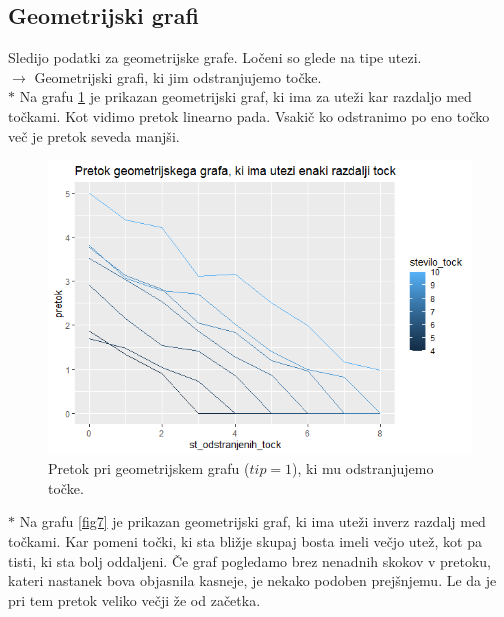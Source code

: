 \documentclass[a4paper]{article}
\begin{document}
\subsection{Geometrijski grafi}
Sledijo podatki za geometrijske grafe. Ločeni so glede na tipe utezi. \\

$\rightarrow $ Geometrijski grafi, ki jim odstranjujemo točke. \\

$\ast$ Na grafu \ref{fig6} je prikazan geometrijski graf, ki ima za uteži kar razdaljo med točkami. Kot vidimo pretok linearno pada. Vsakič ko odstranimo po eno točko več je pretok seveda manjši.

\begin{figure}[H]
\centerline{\includegraphics[scale=.5]{p6_1.PNG}}
\caption{Pretok pri geometrijskem grafu ($tip = 1$), ki mu odstranjujemo točke.}
\label{fig6}
\end{figure}

$\ast$  Na grafu \ref{fig7} je prikazan geometrijski graf, ki ima uteži inverz razdalj med točkami. Kar pomeni točki, ki sta bližje skupaj bosta imeli večjo utež, kot pa tisti, ki sta bolj oddaljeni. Če graf pogledamo brez nenadnih skokov v pretoku, kateri nastanek bova objasnila kasneje, je nekako podoben prejšnjemu. Le da je pri tem pretok veliko večji že od začetka. 
\end{document}

